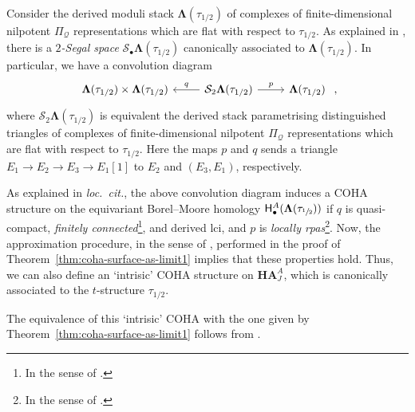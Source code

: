 \documentclass[reqno,a4paper]{amsart}
\newcommand{\calS}{\mathcal{S}}
\newcommand{\dLambda}{\mathbf{\Lambda}}
\newcommand{\qv}{\mathcal{Q}}
\newcommand{\HBMbulletA}{\mathsf{H}_\bullet^A}
\newcommand{\coha}{\mathbf{HA}}
\theoremstyle{basic-theorem}
\numberwithin{equation}{section}
\begin{document}
\begin{remark}
	Consider the derived moduli stack $\dLambda(\tau_{1/2})$ of complexes of finite-dimensional nilpotent $\Pi_\qv$ representations which are flat with respect to $\tau_{1/2}$. As explained in \cite[\S\ref*{torsion-pairs-sec:COHA-t-structure}]{DPS_Torsion-pairs}, there is a \textit{$2$-Segal space} $\calS_\bullet \dLambda(\tau_{1/2})$ canonically associated to $\dLambda(\tau_{1/2})$. In particular, we have a convolution diagram
	\begin{align}
		\begin{tikzcd}[ampersand replacement=\&]
			\dLambda(\tau_{1/2}) \times \dLambda(\tau_{1/2}) \& \calS_2\dLambda(\tau_{1/2}) \ar{r}{p} \ar{l}[swap]{q}  \& \dLambda(\tau_{1/2})
		\end{tikzcd}\ ,
	\end{align}
	where $\calS_2\dLambda(\tau_{1/2})$ is equivalent the derived stack parametrising distinguished triangles of complexes of finite-dimensional nilpotent $\Pi_\qv$ representations which are flat with respect to $\tau_{1/2}$. Here the maps $p$ and $q$ sends a triangle $E_1\to E_2 \to E_3 \to E_1[1]$ to $E_2$ and $(E_3, E_1)$, respectively. 
	
	As explained in \textit{loc.\ cit.}, the above convolution diagram induces a COHA structure on the equivariant Borel--Moore homology $\HBMbulletA(\dLambda(\tau_{\sfrac{1}{2}}))$ if $q$ is quasi-compact, \textit{finitely connected}\footnote{In the sense of \cite[Definition~\ref*{torsion-pairs-def:modified_classes_of_morphisms}--(\ref*{torsion-pairs-item:finitely-connected})]{DPS_Torsion-pairs}.}, and derived lci, and $p$ is \textit{locally rpas}\footnote{In the sense of \cite[Definition~\ref*{torsion-pairs-def:modified_classes_of_morphisms}--(\ref*{torsion-pairs-item:locally-rpas})]{DPS_Torsion-pairs}.}. Now, the approximation procedure, in the sense of \cite[\S\ref*{COHA-Yangian-sec:stabilization}]{DPSSV-3}, performed in the proof of Theorem~\ref{thm:coha-surface-as-limit1} implies that these properties hold. Thus, we can also define an `intrisic' COHA structure on $\coha_J^A$, which is canonically associated to the $t$-structure $\tau_{1/2}$. 
	
	The equivalence of this `intrisic' COHA with the one given by Theorem~\ref{thm:coha-surface-as-limit1} follows from \cite[Theorem~\ref*{COHA-Yangian-thm:coha-surface-as-limit1}--(\ref*{COHA-Yangian-item:coha-surface-as-limit1.1})]{DPSSV-3}.
\end{remark}

\end{document}

